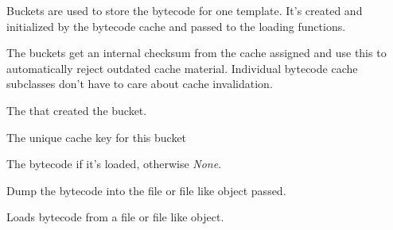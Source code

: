 \documentclass[a4paper,10pt,english]{sphinxmanual}
\begin{document}
\begin{fulllineitems}
\label{api:jinja2.bccache.Bucket}
Buckets are used to store the bytecode for one template.  It's created
and initialized by the bytecode cache and passed to the loading functions.

The buckets get an internal checksum from the cache assigned and use this
to automatically reject outdated cache material.  Individual bytecode
cache subclasses don't have to care about cache invalidation.

\begin{fulllineitems}
\label{api:jinja2.Bucket.environment}
The {\hyperref[api:jinja2.Environment]{}} that created the bucket.

\end{fulllineitems}


\begin{fulllineitems}
\label{api:jinja2.Bucket.key}
The unique cache key for this bucket

\end{fulllineitems}


\begin{fulllineitems}
\label{api:jinja2.Bucket.code}
The bytecode if it's loaded, otherwise \emph{None}.

\end{fulllineitems}


\begin{fulllineitems}
\label{api:jinja2.bccache.Bucket.write_bytecode}
Dump the bytecode into the file or file like object passed.

\end{fulllineitems}


\begin{fulllineitems}
\label{api:jinja2.bccache.Bucket.load_bytecode}
Loads bytecode from a file or file like object.


\end{fulllineitems}
\end{fulllineitems}
\end{document}
